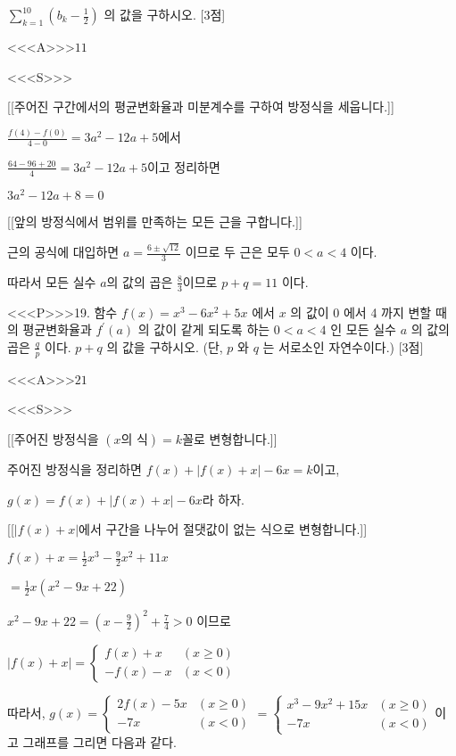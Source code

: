 \documentclass{oblivoir}
\begin{document}
$\sum_{k=1}^{10}\left(b_{k}-\frac{1}{2}\right)$ 의 값을 구하시오. [3점]

<<<A>>>$11$

<<<S>>>

[[주어진 구간에서의 평균변화율과 미분계수를 구하여 방정식을 세웁니다.]]

$ \frac{f(4)-f(0)}{4-0}=3 a^{2}-12 a+5$에서

$\frac{64-96+20}{4}=3 a^{2}-12 a+5 $이고 정리하면

$3 a^{2}-12 a+8=0$

[[앞의 방정식에서 범위를 만족하는 모든 근을 구합니다.]]

근의 공식에 대입하면 $a=\frac{6 \pm \sqrt{12}}{3}$ 이므로 두 근은 모두 $0<a<4$ 이다.

따라서 모든 실수 $a$의 값의 곱은 $\frac{8}{3}$이므로 $p+q=11$ 이다.


<<<P>>>19. 함수 $f(x)=x^{3}-6 x^{2}+5 x$ 에서 $x$ 의 값이 0 에서 4 까지 변할 때의 평균변화율과 $f^{\prime}(a)$ 의 값이 같게 되도록 하는 $0<a<4$ 인 모든 실수 $a$ 의 값의 곱은 $\frac{q}{p}$ 이다. $p+q$ 의 값을 구하시오. (단, $p$ 와 $q$ 는 서로소인 자연수이다.) [3점]

<<<A>>>$21$

<<<S>>>

[[주어진 방정식을 $(x\text{의 식})=k$꼴로 변형합니다.]]

주어진 방정식을 정리하면 $f(x)+ \left| f(x)+x \right| -6x =k$이고,

$g(x)=f(x)+ \left| f(x)+x \right| -6x $라 하자.

[[$\left| f(x)+x \right|$에서 구간을 나누어 절댓값이 없는 식으로 변형합니다.]]

$f(x)+x=\frac{1}{2} x^{3}-\frac{9}{2} x^{2}+11 x$

$=\frac{1}{2} x\left(x^{2}-9 x+22\right)$

$x^{2}-9 x+22=\left(x-\frac{9}{2}\right)^{2}+\frac{7}{4}>0 $ 이므로

$|f(x)+x|= \begin{cases}f(x)+x & (x \geq 0) \\
-f(x)-x & (x<0)\end{cases}$

따라서, 
$g(x)=\begin{cases} 2f(x)-5x & (x \geq 0) \\
    -7x & (x<0)\end{cases} = \begin{cases}
x^{3}-9 x^{2}+15 x & (x \geq 0) \\
-7 x & (x<0)
\end{cases}$이고 그래프를 그리면 다음과 같다.
\end{document}
